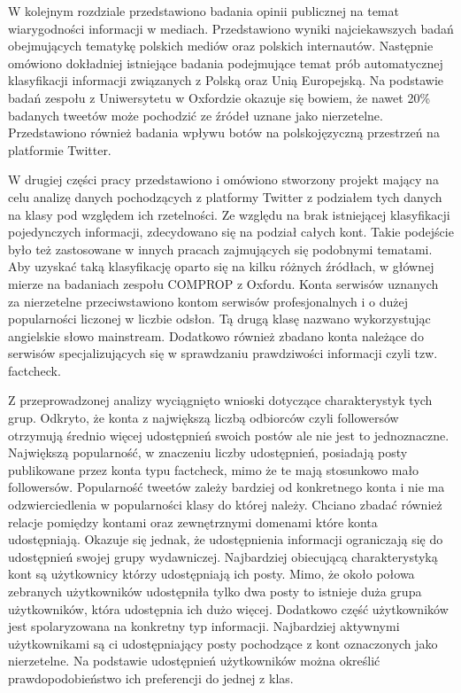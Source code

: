 \par
W kolejnym rozdziale przedstawiono badania opinii publicznej na temat wiarygodności informacji w mediach. Przedstawiono wyniki najciekawszych badań obejmujących tematykę polskich mediów oraz polskich internautów. Następnie omówiono dokładniej istniejące badania podejmujące temat prób automatycznej klasyfikacji informacji związanych z Polską oraz Unią Europejską.  Na podstawie badań zespołu z Uniwersytetu w Oxfordzie okazuje się bowiem, że nawet 20\% badanych tweetów może pochodzić ze źródeł uznane jako nierzetelne.  Przedstawiono również badania wpływu botów na polskojęzyczną przestrzeń na platformie Twitter. 
\par
W drugiej części pracy przedstawiono i omówiono stworzony projekt mający na celu analizę danych pochodzących z platformy Twitter z podziałem tych danych na klasy pod względem ich rzetelności.  Ze względu na brak istniejącej klasyfikacji pojedynczych informacji, zdecydowano się  na podział całych kont. Takie podejście było też zastosowane w innych pracach zajmujących się podobnymi tematami. Aby uzyskać taką klasyfikację oparto się na kilku różnych źródłach, w głównej mierze na badaniach zespołu COMPROP z Oxfordu. Konta serwisów uznanych za nierzetelne przeciwstawiono kontom serwisów profesjonalnych i o dużej popularności liczonej w liczbie odsłon. Tą drugą klasę nazwano wykorzystując angielskie słowo mainstream. Dodatkowo również zbadano konta należące do serwisów specjalizujących się w sprawdzaniu prawdziwości informacji czyli tzw. factcheck. 
\par
Z przeprowadzonej analizy wyciągnięto wnioski dotyczące charakterystyk tych grup. Odkryto, że konta z największą liczbą odbiorców czyli followersów otrzymują średnio więcej udostępnień swoich postów ale nie jest to jednoznaczne. Największą popularność, w znaczeniu liczby udostępnień, posiadają posty publikowane przez konta typu factcheck, mimo że te mają stosunkowo mało followersów. Popularność tweetów zależy bardziej od konkretnego konta i nie ma odzwierciedlenia w popularności klasy do której należy. Chciano zbadać również relacje pomiędzy kontami oraz zewnętrznymi domenami które konta udostępniają. Okazuje się jednak, że udostępnienia informacji ograniczają się do udostępnień swojej grupy wydawniczej. Najbardziej obiecującą charakterystyką kont są użytkownicy którzy udostępniają ich posty. Mimo, że około połowa zebranych użytkowników udostępniła tylko dwa posty to istnieje duża grupa użytkowników, która udostępnia ich dużo więcej. Dodatkowo część użytkowników jest spolaryzowana na konkretny typ informacji. Najbardziej aktywnymi użytkownikami są ci udostępniający posty pochodzące z kont oznaczonych jako nierzetelne. Na podstawie udostępnień użytkowników można określić prawdopodobieństwo ich preferencji do jednej z klas.
